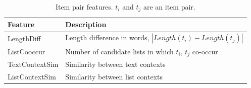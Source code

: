 \begin{table}[!ht]
\centering
\caption{Item pair features. $t_i$ and $t_j$ are an item pair.}
\label{tab:facet-pfeature}
\begin{tabular}{ |l|l| } \hline
  Feature  & Description \\ \hline
  LengthDiff  & Length difference in words, $|Length(t_i) - Length(t_j)|$ \\
  ListCooccur & Number of candidate lists in which $t_i$, $t_j$ co-occur\\
  TextContextSim & Similarity between text contexts\\
  ListContextSim & Similarity between list contexts\\
\hline
\end{tabular}
\end{table}


